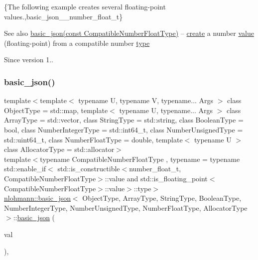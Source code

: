 \{The following example creates several floating-\/point values.,basic\+\_\+json\+\_\+\+\_\+number\+\_\+float\+\_\+t\}

\begin{DoxySeeAlso}{See also}
\hyperlink{classnlohmann_1_1basic__json_a4bbdfd6dd8d2e6fc9ac5d81ef61ba3fe}{basic\+\_\+json(const Compatible\+Number\+Float\+Type)} -- \hyperlink{classnlohmann_1_1basic__json_afdb7a485369fbfd8c4c7c134ebb1feb5}{create} a number \hyperlink{classnlohmann_1_1basic__json_a407e73a037e6e3067ef7aa2c25a79f39}{value} (floating-\/point) from a compatible number \hyperlink{classnlohmann_1_1basic__json_a5d466b240d0ba9f648d7fd4ff42359f5}{type}
\end{DoxySeeAlso}
\begin{DoxySince}{Since}
version 1.. 
\end{DoxySince}
\hypertarget{classnlohmann_1_1basic__json_a4bbdfd6dd8d2e6fc9ac5d81ef61ba3fe}{}\label{classnlohmann_1_1basic__json_a4bbdfd6dd8d2e6fc9ac5d81ef61ba3fe} 
\subsubsection{\texorpdfstring{basic\+\_\+json()}{basic\_json()}\hspace{0.1cm}{\footnotesize\ttfamily [17/23]}}
{\footnotesize\ttfamily template$<$template$<$ typename U, typename V, typename... Args $>$ class Object\+Type = std\+::map, template$<$ typename U, typename... Args $>$ class Array\+Type = std\+::vector, class String\+Type  = std\+::string, class Boolean\+Type  = bool, class Number\+Integer\+Type  = std\+::int64\+\_\+t, class Number\+Unsigned\+Type  = std\+::uint64\+\_\+t, class Number\+Float\+Type  = double, template$<$ typename U $>$ class Allocator\+Type = std\+::allocator$>$ \\
template$<$typename Compatible\+Number\+Float\+Type , typename  = typename std\+::enable\+\_\+if$<$                 std\+::is\+\_\+constructible$<$number\+\_\+float\+\_\+t, Compatible\+Number\+Float\+Type$>$\+::value and                 std\+::is\+\_\+floating\+\_\+point$<$\+Compatible\+Number\+Float\+Type$>$\+::value$>$\+::type$>$ \\
\hyperlink{classnlohmann_1_1basic__json}{nlohmann\+::basic\+\_\+json}$<$ Object\+Type, Array\+Type, String\+Type, Boolean\+Type, Number\+Integer\+Type, Number\+Unsigned\+Type, Number\+Float\+Type, Allocator\+Type $>$\+::\hyperlink{classnlohmann_1_1basic__json}{basic\+\_\+json} (\begin{DoxyParamCaption}\item[{const Compatible\+Number\+Float\+Type}]{val }\end{DoxyParamCaption})\hspace{0.3cm}{\ttfamily [inline]}, {\ttfamily [noexcept]}}



